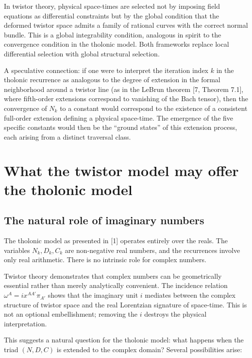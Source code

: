 \documentclass[12pt]{article}
\begin{document}
In twistor theory, physical space-times are selected not by imposing
field equations as differential constraints but by the global condition
that the deformed twistor space admits a family of rational curves with
the correct normal bundle. This is a global integrability condition,
analogous in spirit to the convergence condition in the tholonic model.
Both frameworks replace local differential selection with global
structural selection.

A speculative connection: if one were to interpret the iteration index
\(k\) in the tholonic recurrence as analogous to the degree of extension
in the formal neighborhood around a twistor line (as in the LeBrun
theorem {[}7, Theorem 7.1{]}, where fifth-order extensions correspond to
vanishing of the Bach tensor), then the convergence of \(N_k\) to a
constant would correspond to the existence of a consistent full-order
extension defining a physical space-time. The emergence of the five
specific constants would then be the ``ground states'' of this extension
process, each arising from a distinct traversal class.

\section{What the twistor model may offer the tholonic model}\label{what-the-twistor-model-may-offer-the-tholonic-model}

\subsection{The natural role of imaginary numbers}\label{the-natural-role-of-imaginary-numbers}

The tholonic model as presented in {[}1{]} operates entirely over the
reals. The variables \(N_k, D_k, C_k\) are non-negative real numbers,
and the recurrences involve only real arithmetic. There is no intrinsic
role for complex numbers.

Twistor theory demonstrates that complex numbers can be geometrically
essential rather than merely analytically convenient. The incidence
relation \(\omega^A = i x^{AA'} \pi_{A'}\) shows that the imaginary unit
\(i\) mediates between the complex structure of twistor space and the
real Lorentzian signature of space-time. This is not an optional
embellishment; removing the \(i\) destroys the physical interpretation.

This suggests a natural question for the tholonic model: what happens
when the triad \((N, D, C)\) is extended to the complex domain? Several
possibilities arise:
\end{document}
